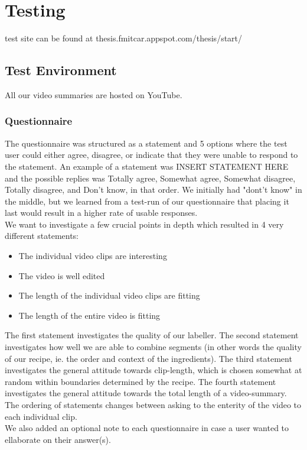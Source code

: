 %
\section{Testing}
%
test site can be found at thesis.fmitcar.appspot.com/thesis/start/
%
\subsection{Test Environment}
%

%
All our video summaries are hosted on YouTube.
%
\subsubsection{Questionnaire}
%
%
The questionnaire was structured as a statement and 5 options
%
%
where the test user could either agree, disagree, or indicate that they were unable to respond to the statement. An example of a statement was INSERT STATEMENT HERE and the possible replies was Totally agree, Somewhat agree, Somewhat disagree, Totally disagree, and Don't know, in that order. We initially had "dont't know" in the middle, but we learned from a test-run of our questionnaire that placing it last would result in a higher rate of usable responses.\\
%
%
%
%
We want to investigate a few crucial points in depth which resulted in 4 very different statements:
%
\begin{itemize}
\item The individual video clips are interesting
\item The video is well edited
\item The length of the individual video clips are fitting
\item The length of the entire video is fitting
\end{itemize}
%
The first statement investigates the quality of our labeller. The second statement investigates how well we are able to combine segments (in other words the quality of our recipe, ie. the order and context of the ingredients). The third statement investigates the general attitude towards clip-length, which is chosen somewhat at random within boundaries determined by the recipe. The fourth statement investigates the general attitude towards the total length of a video-summary. The ordering of statements changes between asking to the enterity of the video to each individual clip.\\
We also added an optional note to each questionnaire in case a user wanted to ellaborate on their answer(s).
%

